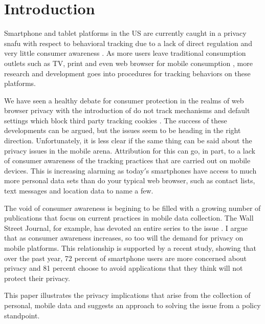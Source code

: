 \section {Introduction}

Smartphone and tablet platforms in the US are currently caught in a privacy snafu with respect to behavioral tracking due to a lack of direct regulation \cite{Priv2013} and very little consumer awareness \cite{Jenn2012}. As more users leave traditional consumption outlets such as TV, print and even web browser for mobile consumption \cite{Abi2012}, more research and development goes into procedures for tracking behaviors on these platforms.

We have seen a healthy debate for consumer protection in the realms of web browser privacy with the introduction of do not track mechanisms \cite{W3C2012} and default settings which block third party tracking cookies \cite{Moz2013}. The success of these developments can be argued, but the issues seem to be heading in the right direction. Unfortunately, it is less clear if the same thing can be said about the privacy issues in the mobile arena. 
Attribution for this can go, in part, to a lack of consumer awareness of the tracking practices that are carried out on mobile devices\cite{?}. 
This is increasing alarming as today$'$s smartphones have access to much more personal data sets than do your typical web browser, such as contact lists, text messages and location data to name a few. 


The void of consumer awareness is begining to be filled with a growing number of publications that focus on current practices in mobile data collection. The Wall Street Journal, for example, has devoted an entire series to the issue \cite{Wsj2013}. I argue that as consumer awareness increases, so too will the demand for privacy on mobile platforms. This relationship is supported by a recent study\cite{Trust2013}, showing that over the past year, 72 percent of smartphone users are more concerned about privacy and 81 percent choose to avoid applications that they think will not protect their privacy. 

This paper illustrates the privacy implications that arise from the collection of personal, mobile data and suggests an approach to solving the issue from a policy standpoint.  

  
